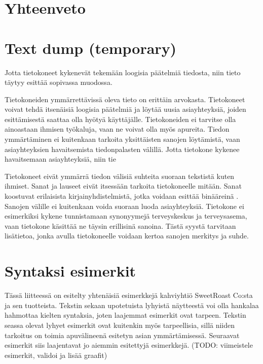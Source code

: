 \documentclass[finnish, 12pt, a4paper, elec, utf8, pdfa, online]{aaltothesis}
\begin{document}
\clearpage
\section{Yhteenveto}



\clearpage
\section{Text dump (temporary)}

Jotta tietokoneet kykenevät tekemään loogisia päätelmiä tiedosta, niin tieto täytyy esittää sopivassa muodossa.

Tietokoneiden ymmärrettävissä oleva tieto on erittäin arvokasta. Tietokoneet voivat tehdä itsenäisiä loogisia päätelmiä ja löytää uusia asiayhteyksiä, joiden esittämisestä saattaa olla hyötyä käyttäjälle. Tietokoneiden ei tarvitse olla ainoastaan ihmisen työkaluja, vaan ne voivat olla myös apureita. Tiedon ymmärtäminen ei kuitenkaan tarkoita yksittäisten sanojen löytämistä, vaan asiayhteyksien havaitsemista tiedonpalasten välillä. Jotta tietokone kykenee havaitsemaan asiayhteyksiä, niin tie



Tietokoneet eivät ymmärrä tiedon välisiä suhteita suoraan tekstistä kuten ihmiset. Sanat ja lauseet eivät itsessään tarkoita tietokoneelle mitään. Sanat koostuvat erilaisista kirjainyhdistelmistä, jotka voidaan esittää binääreinä \cite{ASCII}. Sanojen välille ei kuitenkaan voida suoraan luoda asiayhteyksiä. Tietokone ei esimerkiksi kykene tunnistamaan synonyymejä terveyskeskus ja terveysasema, vaan tietokone käsittää ne täysin erillisinä sanoina. Tästä syystä tarvitaan lisätietoa, jonka avulla tietokoneelle voidaan kertoa sanojen merkitys ja suhde.

\clearpage


\clearpage
\thesisappendix

\section{Syntaksi esimerkit\label{LiiteA}}

Tässä liitteessä on esitelty yhtenäisiä esimerkkejä kahviyhtiö SweetRoast Co:sta ja sen tuotteista. Tekstin sekaan upotetuista lyhyistä näytteestä voi olla hankalaa hahmottaa kielten syntaksia, joten laajemmat esimerkit ovat tarpeen. Tekstin seassa olevat lyhyet esimerkit ovat kuitenkin myös tarpeellisia, sillä niiden tarkoitus on toimia apuvälineenä esitetyn asian ymmärtämisessä. Seuraavat esimerkit siis laajentavat jo aiemmin esitettyjä esimerkkejä. (TODO: viimeistele esimerkit, validoi ja lisää graafit)
\end{document}
